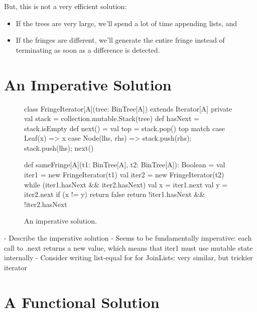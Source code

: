 \documentclass{book}
\begin{document}
But, this is not a very efficient solution:
\begin{itemize}

  \item If the trees are very large, we'll spend a lot of time appending
  lists, and

  \item If the fringes are different, we'll generate the entire fringe instead
  of terminating as soon as a difference is detected.

\end{itemize}

\section{An Imperative Solution}

\begin{figure}
\begin{scalacode}
class FringeIterator[A](tree: BinTree[A]) extends Iterator[A] {
  private val stack = collection.mutable.Stack(tree)
  def hasNext = stack.isEmpty
  def next() = {
    val top = stack.pop()
    top match {
      case Leaf(x) => x
      case Node(lhs, rhs) => { stack.push(rhs); stack.push(lhs); next() }
    }
  }
}

def sameFringe[A](t1: BinTree[A], t2: BinTree[A]): Boolean = {
  val iter1 = new FringeIterator(t1)
  val iter2 = new FringeIterator(t2)
  while (iter1.hasNext && iter2.hasNext) {
    val x = iter1.next
    val y = iter2.next
    if (x != y) {
      return false
    }
  }
  return !iter1.hasNext && !iter2.hasNext
}
\end{scalacode}
\caption{An imperative solution.}
\label{samefringe_imperative}
\end{figure}

- Describe the imperative solution
- Seems to be fundamentally imperative: each call to .next returns a new value,
  which means that iter1 must use mutable state internally
- Consider writing list-equal for for JoinLists: very similar, but trickier
  iterator


\section{A Functional Solution}
\end{document}
